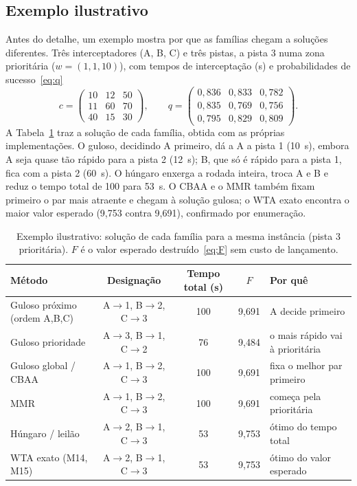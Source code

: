 \documentclass[11pt,a4paper]{article}
\begin{document}
\subsection{Exemplo ilustrativo}\label{sec:exemplo}
Antes do detalhe, um exemplo mostra por que as famílias chegam a soluções diferentes. Três interceptadores (A, B, C)
e três pistas, a pista 3 numa zona prioritária ($w=(1,1,10)$), com tempos de interceptação (s) e probabilidades de
sucesso~\eqref{eq:q}
\begin{equation*}
  c=\begin{pmatrix} 10 & 12 & 50\\ 11 & 60 & 70\\ 40 & 15 & 30\end{pmatrix},
  \qquad
  q=\begin{pmatrix} 0{,}836 & 0{,}833 & 0{,}782\\ 0{,}835 & 0{,}769 & 0{,}756\\ 0{,}795 & 0{,}829 & 0{,}809\end{pmatrix}.
\end{equation*}
A Tabela~\ref{tab:exemplo} traz a solução de cada família, obtida com as próprias implementações. O guloso, decidindo A
primeiro, dá a A a pista 1 (10~s), embora A seja quase tão rápido para a pista 2 (12~s); B, que só é rápido para a pista
1, fica com a pista 2 (60~s). O húngaro enxerga a rodada inteira, troca A e B e reduz o tempo total de 100 para 53~s. O
CBAA e o MMR também fixam primeiro o par mais atraente e chegam à solução gulosa; o WTA exato encontra o maior valor
esperado (9,753 contra 9,691), confirmado por enumeração.

\begin{table}[t]
\centering
\caption{Exemplo ilustrativo: solução de cada família para a mesma instância (pista 3 prioritária). $F$ é o valor
esperado destruído~\eqref{eq:F} sem custo de lançamento.}
\label{tab:exemplo}
\small
\begin{tabular}{@{}lcccl@{}}
\toprule
Método & Designação & Tempo total (s) & $F$ & Por quê \\
\midrule
Guloso próximo (ordem A,B,C) & A$\to$1, B$\to$2, C$\to$3 & 100 & 9,691 & A decide primeiro \\
Guloso prioridade & A$\to$3, B$\to$1, C$\to$2 & 76 & 9,484 & o mais rápido vai à prioritária \\
Guloso global / CBAA & A$\to$1, B$\to$2, C$\to$3 & 100 & 9,691 & fixa o melhor par primeiro \\
MMR & A$\to$1, B$\to$2, C$\to$3 & 100 & 9,691 & começa pela prioritária \\
Húngaro / leilão & A$\to$2, B$\to$1, C$\to$3 & 53 & 9,753 & ótimo do tempo total \\
WTA exato (M14, M15) & A$\to$2, B$\to$1, C$\to$3 & 53 & 9,753 & ótimo do valor esperado \\
\bottomrule
\end{tabular}
\end{table}
\end{document}
